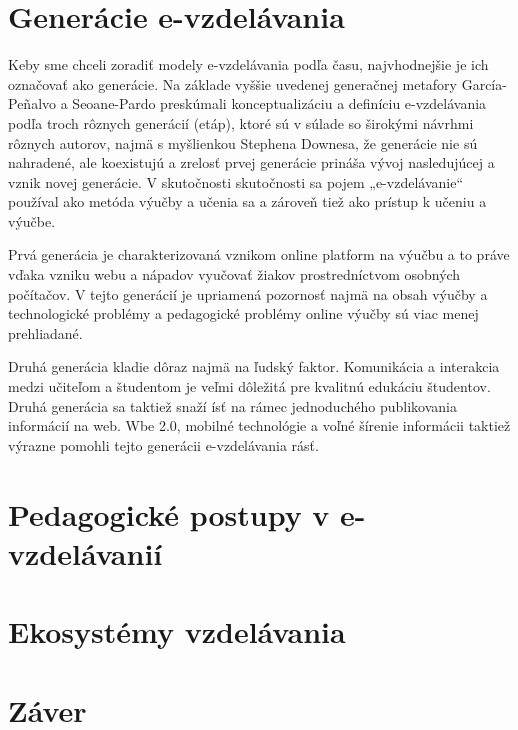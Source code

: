 \documentclass[10pt,slovak,a4paper]{article}
\begin{document}
\section{Generácie e-vzdelávania} \label{Generations}

	Keby sme chceli zoradiť modely e-vzdelávania podľa času, najvhodnejšie je ich označovať ako generácie. Na základe vyššie uvedenej generačnej metafory García-Peñalvo a Seoane-Pardo preskúmali konceptualizáciu a definíciu e-vzdelávania podľa troch rôznych generácií (etáp), ktoré sú v súlade so širokými návrhmi rôznych autorov, najmä s myšlienkou Stephena Downesa, že generácie nie sú nahradené, ale koexistujú a zrelosť prvej generácie prináša vývoj nasledujúcej a vznik novej generácie. V skutočnosti skutočnosti sa pojem „e-vzdelávanie“ používal ako metóda výučby a učenia sa a zároveň tiež ako prístup k učeniu a výučbe.
	\cite{main}

	Prvá generácia je charakterizovaná vznikom online platform na výučbu a to práve vďaka vzniku webu a nápadov vyučovať žiakov prostredníctvom osobných počítačov. V tejto generácií je upriamená pozornosť najmä na obsah výučby a technologické problémy a pedagogické problémy online výučby sú viac menej prehliadané.
	\cite{main}

	Druhá generácia kladie dôraz najmä na ľudský faktor. Komunikácia a interakcia medzi učiteľom a študentom je veľmi dôležitá pre kvalitnú edukáciu študentov. Druhá generácia sa taktiež snaží ísť na rámec jednoduchého publikovania informácií na web. Wbe 2.0, mobilné technológie a voľné šírenie informácii taktiež výrazne pomohli tejto generácii e-vzdelávania rásť.
	\cite{main}
	
\section{Pedagogické postupy v e-vzdelávanií} \label{pedagogicalApproaches}

\section{Ekosystémy vzdelávania} \label{ecosystems}



\section{Záver} \label{zaver} 
\newpage

\end{document}
